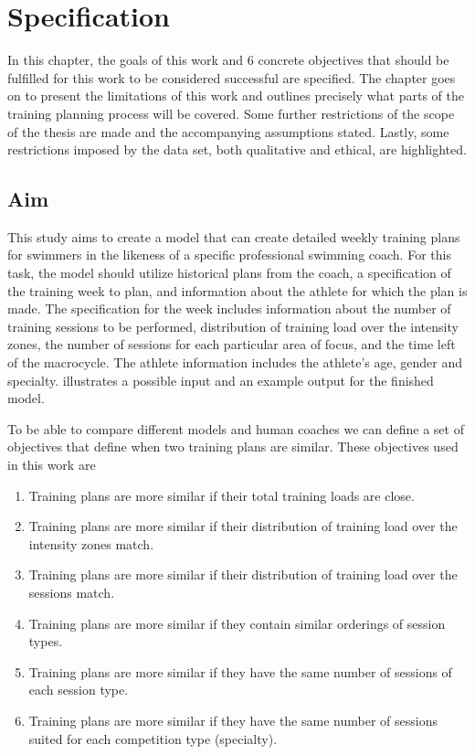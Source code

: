 \chapter{Specification}
In this chapter, the goals of this work and 6 concrete objectives that should be fulfilled for this work to be considered successful are specified.
The chapter goes on to present the limitations of this work and outlines precisely what parts of the training planning process will be covered.
Some further restrictions of the scope of the thesis are made and the accompanying assumptions stated.
Lastly, some restrictions imposed by the data set, both qualitative and ethical, are highlighted.


\section{Aim}
\label{sec:aim}

This study aims to create a model that can create detailed weekly training plans for swimmers in the likeness of a specific professional swimming coach.
For this task, the model should utilize historical plans from the coach, a specification of the training week to plan, and information about the athlete for which the plan is made.
The specification for the week includes information about the number of training sessions to be performed, distribution of training load over the intensity zones, the number of sessions for each particular area of focus, and the time left of the macrocycle.
The athlete information includes the athlete's age, gender and specialty. 
 illustrates a possible input and an example output for the finished model.

To be able to compare different models and human coaches we can define a set of objectives that define when two training plans are similar.
These objectives used in this work are
\begin{enumerate}
    \item \label{constraint:tl_total}Training plans are more similar if their total training loads are close.
    \item \label{constraint:tl_zones}Training plans are more similar if their distribution of training load over the intensity zones match.
    \item \label{constraint:tl_week}Training plans are more similar if their distribution of training load over the sessions match.
    \item \label{constraint:order}Training plans are more similar if they contain similar orderings of session types.
    \item \label{constraint:types}Training plans are more similar if they have the same number of sessions of each session type.
    \item \label{constraint:specialty}Training plans are more similar if they have the same number of sessions suited for each competition type (specialty).
\end{enumerate}

